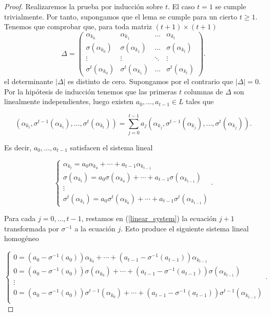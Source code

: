 \begin{proof}
    Realizaremos la prueba por inducción sobre \(t\). El caso \(t = 1\) se cumple trivialmente. Por tanto, supongamos que el lema se cumple para un cierto  \(t \geq 1\). Tenemos que comprobar que, para toda matriz \((t+1) \times (t+1)\)
    \[
    \Delta =
    \begin{pmatrix}
        \alpha_{k_0} & \alpha_{k_1} & \dots & \alpha_{k_{t}} \\
        \sigma(\alpha_{k_0}) & \sigma(\alpha_{k_1}) & \dots & \sigma(\alpha_{k_{t}}) \\
        \vdots & \vdots & \ddots & \vdots \\
        \sigma^{t}(\alpha_{k_0}) & \sigma^{t}(\alpha_{k_1}) & \dots & \sigma^{t}(\alpha_{k_{t}})

    \end{pmatrix}
    .\]
el determinante \(|\Delta|\) es distinto de cero. Supongamos por el contrario que \(|\Delta| = 0\). Por la hipótesis de inducción tenemos que las primeras \(t\) columnas de \(\Delta\) son linealmente independientes, luego existen \(a_0, \dots, a_{t-1} \in L\) tales que

\[
(\alpha_{k_t}, \sigma^{t-1}(\alpha_{k_t}), \dots, \sigma^t(\alpha_{k_t})) = \sum_{j=0}^{t-1} a_j(\alpha_{k_j}, \sigma^{t-1}(\alpha_{k_j}), \dots, \sigma^t(\alpha_{k_j}))
.\]

Es decir, \(a_0, \dots, a_{t-1}\) satisfacen el sistema lineal

\begin{equation}
\label{linear_system}
\begin{cases}
    \alpha_{k_t} = a_0\alpha_{k_0} + \cdots + a_{t-1}\alpha_{k_{t-1}} \\
    \sigma(\alpha_{k_t}) = a_0\sigma(\alpha_{k_0}) + \cdots + a_{t-1}\sigma(\alpha_{k_{t-1}}) \\
    \vdots \\
    \sigma^t(\alpha_{k_t}) = a_0\sigma^t(\alpha_{k_0}) + \cdots + a_{t-1}\sigma^t(\alpha_{k_{t-1}})
\end{cases}
.
\end{equation}

Para cada \(j = 0, \dots, t-1\), restamos en (\ref{linear_system}) la ecuación \(j+1\) transformada por \(\sigma^{-1}\) a la ecuación \(j\). Esto produce el siguiente sistema lineal homogéneo

\begin{equation}
\label{hom_liner_system}
\begin{cases}
0 = (a_0 - \sigma^{-1}(a_0))\alpha_{k_0} + \cdots + (a_{t-1} - \sigma^{-1}(a_{t-1}))\alpha_{k_{t-1}} \\
0 = (a_0 - \sigma^{-1}(a_0))\sigma(\alpha_{k_0}) + \cdots + (a_{t-1} - \sigma^{-1}(a_{t-1}))\sigma(\alpha_{k_{t-1}}) \\
\vdots \\
0 = (a_0 - \sigma^{-1}(a_0))\sigma^{t-1}(\alpha_{k_0}) + \cdots + (a_{t-1} - \sigma^{-1}(a_{t-1}))\sigma^{t-1}(\alpha_{k_{t-1}}) \\
\end{cases}
.
\end{equation}


\end{proof}
